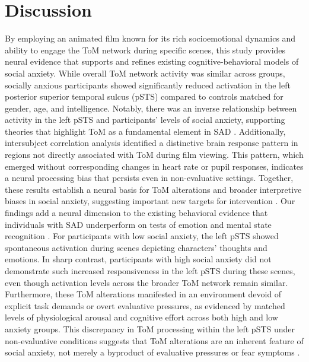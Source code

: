 \section*{Discussion}
By employing an animated film known for its rich socioemotional dynamics and ability to engage the ToM network during specific scenes, this study provides neural evidence that supports and refines existing cognitive-behavioral models of social anxiety. While overall ToM network activity was similar across groups, socially anxious participants showed significantly reduced activation in the left posterior superior temporal sulcus (pSTS) compared to controls matched for gender, age, and intelligence. Notably, there was an inverse relationship between activity in the left pSTS and participants' levels of social anxiety, supporting theories that highlight ToM as a fundamental element in SAD \citep{hezel2014,baez2023}. Additionally, intersubject correlation analysis identified a distinctive brain response pattern in regions not directly associated with ToM during film viewing. This pattern, which emerged without corresponding changes in heart rate or pupil responses, indicates a neural processing bias that persists even in non-evaluative settings. Together, these results establish a neural basis for ToM alterations and broader interpretive biases in social anxiety, suggesting important new targets for intervention \citep{clark1995,rapee1997}.
Our findings add a neural dimension to the existing behavioral evidence that individuals with SAD underperform on tests of emotion and mental state recognition \citep{baez2023}. For participants with low social anxiety, the left pSTS showed spontaneous activation during scenes depicting characters' thoughts and emotions. In sharp contrast, participants with high social anxiety did not demonstrate such increased responsiveness in the left pSTS during these scenes, even though activation levels across the broader ToM network remain similar. Furthermore, these ToM alterations manifested in an environment devoid of explicit task demands or overt evaluative pressures, as evidenced by matched levels of physiological arousal and cognitive effort across both high and low anxiety groups. This discrepancy in ToM processing within the left pSTS under non-evaluative conditions suggests that ToM alterations are an inherent feature of social anxiety, not merely a byproduct of evaluative pressures or fear symptoms \citep{hezel2014}.
